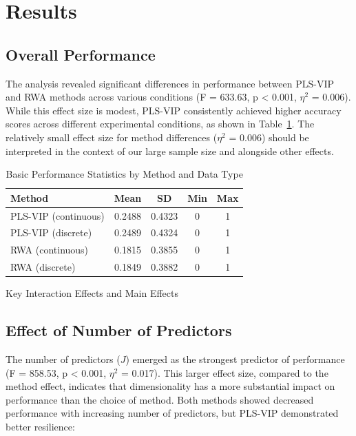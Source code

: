 \section{Results}

\subsection{Overall Performance}
The analysis revealed significant differences in performance between PLS-VIP and RWA methods across various conditions (F = 633.63, p < 0.001, $\eta^2$ = 0.006). While this effect size is modest, PLS-VIP consistently achieved higher accuracy scores across different experimental conditions, as shown in Table~\ref{tab:basic_performance}. The relatively small effect size for method differences ($\eta^2$ = 0.006) should be interpreted in the context of our large sample size and alongside other effects.

\begin{table}[htbp]
\centering
\caption{Basic Performance Statistics by Method and Data Type}
\label{tab:basic_performance}
\begin{small}
\begin{tabular}{@{}lcccc@{}}
\toprule
Method & Mean & SD & Min & Max \\
\midrule
PLS-VIP (continuous) & 0.2488 & 0.4323 & 0 & 1 \\
PLS-VIP (discrete) & 0.2489 & 0.4324 & 0 & 1 \\
RWA (continuous) & 0.1815 & 0.3855 & 0 & 1 \\
RWA (discrete) & 0.1849 & 0.3882 & 0 & 1 \\
\bottomrule
\end{tabular}
\end{small}
\end{table}

\begin{table}[htbp]
\centering
\caption{Key Interaction Effects and Main Effects}
\label{tab:interaction_effects}

\end{table}

\subsection{Effect of Number of Predictors}
The number of predictors ($J$) emerged as the strongest predictor of performance (F = 858.53, p < 0.001, $\eta^2$ = 0.017). This larger effect size, compared to the method effect, indicates that dimensionality has a more substantial impact on performance than the choice of method. Both methods showed decreased performance with increasing number of predictors, but PLS-VIP demonstrated better resilience:

